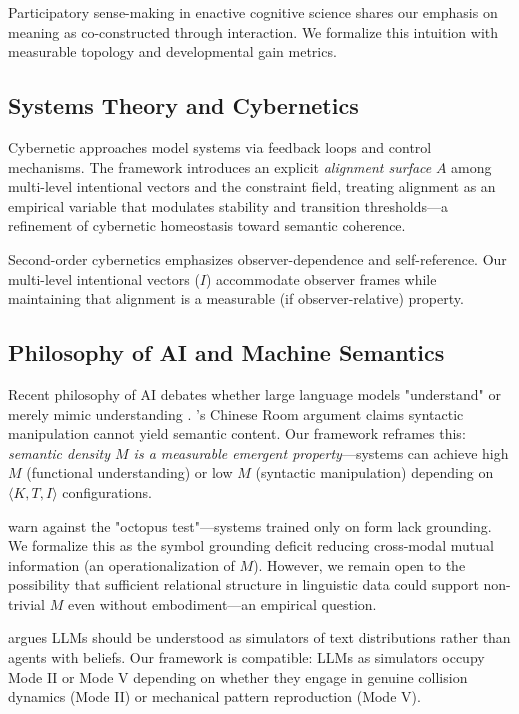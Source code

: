 \documentclass[12pt]{article}
\begin{document}
Participatory sense-making \citep{degjaegher2009participatory} in enactive cognitive science shares our emphasis on meaning as co-constructed through interaction. We formalize this intuition with measurable topology and developmental gain metrics.

\subsection{Systems Theory and Cybernetics}

Cybernetic approaches \citep{wiener1948cybernetics, ashby1956introduction} model systems via feedback loops and control mechanisms. The framework introduces an explicit \textit{alignment surface} $A$ among multi-level intentional vectors and the constraint field, treating alignment as an empirical variable that modulates stability and transition thresholds—a refinement of cybernetic homeostasis toward semantic coherence.

Second-order cybernetics \citep{vonfoerster2003understanding} emphasizes observer-dependence and self-reference. Our multi-level intentional vectors ($I$) accommodate observer frames while maintaining that alignment is a measurable (if observer-relative) property.

\subsection{Philosophy of AI and Machine Semantics}

Recent philosophy of AI debates whether large language models "understand" or merely mimic understanding \citep{bender2020climbing, shanahan2024talking, mitchell2023debate}. \citet{searle1980minds}'s Chinese Room argument claims syntactic manipulation cannot yield semantic content. Our framework reframes this: \textit{semantic density $M$ is a measurable emergent property}—systems can achieve high $M$ (functional understanding) or low $M$ (syntactic manipulation) depending on $\langle K, T, I \rangle$ configurations.

\citet{bender2020climbing} warn against the "octopus test"—systems trained only on form lack grounding. We formalize this as the symbol grounding deficit reducing cross-modal mutual information (an operationalization of $M$). However, we remain open to the possibility that sufficient relational structure in linguistic data could support non-trivial $M$ even without embodiment—an empirical question.

\citet{shanahan2024talking} argues LLMs should be understood as simulators of text distributions rather than agents with beliefs. Our framework is compatible: LLMs as simulators occupy Mode II or Mode V depending on whether they engage in genuine collision dynamics (Mode II) or mechanical pattern reproduction (Mode V).
\end{document}
